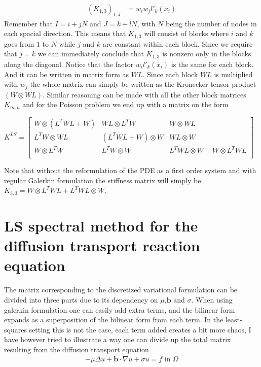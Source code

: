 \begin{align}
	(K_{1,3})_{I,J} &= w_{i}w_{j}l'_k(x_{i})
	\label{eq:MatrixDerivation2}
\end{align}
Remember that $I = i+jN$ and $J = k+lN$, with $N$ being the number of nodes in each spacial direction. This means that $K_{1,3}$ will consist of blocks where $i$ and $k$ goes from $1$ to $N$ while $j$ and $k$ are constant within each block. Since we require that $j=k$ we can immediately conclude that $K_{1,3}$ is nonzero only in the blocks along the diagonal. Notice that the factor $w_il'_k(x_i)$ is the same for each block. And it can be written in matrix form as $WL$. Since each block $WL$ is multiplied with $w_j$ the whole matrix can simply be written as the Kronecker tensor product $(W\otimes WL)$. Similar reasoning can be made with all the other block matrices $K_{m,n}$ and for the Poisson problem we end up with a matrix on the form

%
$
K^{LS} = 
\begin{bmatrix}
	W \otimes (L^TWL+W) & WL \otimes L^TW 		 &	W \otimes WL  \\ 	
	L^TW \otimes WL     & (L^TWL+W) \otimes W  &	WL \otimes W  \\ 	
	W \otimes L^TW		  & L^TW \otimes W       &  L^TWL \otimes W +	W\otimes L^TWL  \\ 	
\end{bmatrix}
$

Note that without the reformulation of the PDE as a first order system and with regular Galerkin formulation the stiffness matrix will simply be 
$K_{3,3} = W \otimes L^TWL+ L^TWL \otimes W$.
\section{LS spectral method for the diffusion transport reaction equation}
The matrix corresponding to the discretized variational formulation can be divided into three parts due to its dependency on $\mu$,$\mathbf{b}$ and $\sigma$. When using galerkin formulation one can easily add extra terms, and the bilinear form expands as a superposition of the bilinear form from each term. In the least-squares setting this is not the case, each term added creates a bit more chaos, I have however tried to illustrate a way one can divide up the total matrix resulting from the diffusion transport equation
\begin{align}
	-\mu \Delta u + \mathbf{b} \cdot \nabla u +\sigma u = f \text{ in } \Omega
	\label{eq:ReactionImplementation}
\end{align}
